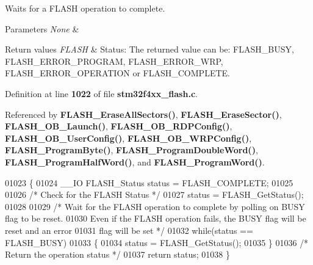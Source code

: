 Waits for a F\+L\+A\+SH operation to complete. 


\begin{DoxyParams}{Parameters}
{\em None} & \\
\hline
\end{DoxyParams}

\begin{DoxyRetVals}{Return values}
{\em F\+L\+A\+SH} & Status\+: The returned value can be\+: F\+L\+A\+S\+H\+\_\+\+B\+U\+SY, F\+L\+A\+S\+H\+\_\+\+E\+R\+R\+O\+R\+\_\+\+P\+R\+O\+G\+R\+AM, F\+L\+A\+S\+H\+\_\+\+E\+R\+R\+O\+R\+\_\+\+W\+RP, F\+L\+A\+S\+H\+\_\+\+E\+R\+R\+O\+R\+\_\+\+O\+P\+E\+R\+A\+T\+I\+ON or F\+L\+A\+S\+H\+\_\+\+C\+O\+M\+P\+L\+E\+TE. \\
\hline
\end{DoxyRetVals}


Definition at line \textbf{ 1022} of file \textbf{ stm32f4xx\+\_\+flash.\+c}.



Referenced by \textbf{ F\+L\+A\+S\+H\+\_\+\+Erase\+All\+Sectors()}, \textbf{ F\+L\+A\+S\+H\+\_\+\+Erase\+Sector()}, \textbf{ F\+L\+A\+S\+H\+\_\+\+O\+B\+\_\+\+Launch()}, \textbf{ F\+L\+A\+S\+H\+\_\+\+O\+B\+\_\+\+R\+D\+P\+Config()}, \textbf{ F\+L\+A\+S\+H\+\_\+\+O\+B\+\_\+\+User\+Config()}, \textbf{ F\+L\+A\+S\+H\+\_\+\+O\+B\+\_\+\+W\+R\+P\+Config()}, \textbf{ F\+L\+A\+S\+H\+\_\+\+Program\+Byte()}, \textbf{ F\+L\+A\+S\+H\+\_\+\+Program\+Double\+Word()}, \textbf{ F\+L\+A\+S\+H\+\_\+\+Program\+Half\+Word()}, and \textbf{ F\+L\+A\+S\+H\+\_\+\+Program\+Word()}.


\begin{DoxyCode}
01023 \{ 
01024   \_\_IO FLASH_Status status = FLASH_COMPLETE;
01025    
01026   \textcolor{comment}{/* Check for the FLASH Status */}
01027   status = FLASH_GetStatus();
01028 
01029   \textcolor{comment}{/* Wait for the FLASH operation to complete by polling on BUSY flag to be reset.}
01030 \textcolor{comment}{     Even if the FLASH operation fails, the BUSY flag will be reset and an error}
01031 \textcolor{comment}{     flag will be set */}
01032   \textcolor{keywordflow}{while}(status == FLASH_BUSY)
01033   \{
01034     status = FLASH_GetStatus();
01035   \}
01036   \textcolor{comment}{/* Return the operation status */}
01037   \textcolor{keywordflow}{return} status;
01038 \}
\end{DoxyCode}
